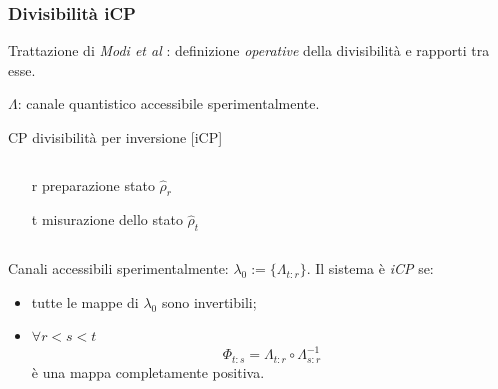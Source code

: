 \documentclass{beamer}
\begin{document}
\begin{frame}
\frametitle{Divisibilità iCP}
Trattazione di \emph{Modi et al} \cite{CPdoesnotimply}: definizione \emph{operative} della divisibilità e rapporti tra esse.

\(\Lambda \): canale quantistico accessibile sperimentalmente.
\pause
\begin{block}{CP divisibilità per inversione [iCP]}
\begin{columns}
	\begin{column}{0.5\textwidth}
		\begin{itemize}
			\item[r] preparazione stato \(\hat{\rho}_r\)
			\item[t] misurazione dello stato \(\hat{\rho}_t\)
		\end{itemize}
	\end{column}
	\begin{column}{0.3\textwidth}
		\resizebox{\textwidth}{!}{}
	\end{column}	
\end{columns}
 Canali accessibili sperimentalmente: \(\lambda_0 := \{\Lambda_{t\colon r}\}\). Il sistema è \emph{iCP} se:
 \begin{itemize}
    	\item tutte le mappe di \(\lambda_0\) sono invertibili;
    	\item \(\forall r<s<t\)
 	      \[\Phi_{t\colon s} = \Lambda_{t\colon r} \circ \Lambda^{-1}_{s\colon r}\]
 	      è una mappa completamente positiva.
 \end{itemize}
\end{block}

\end{frame}
\end{document}
